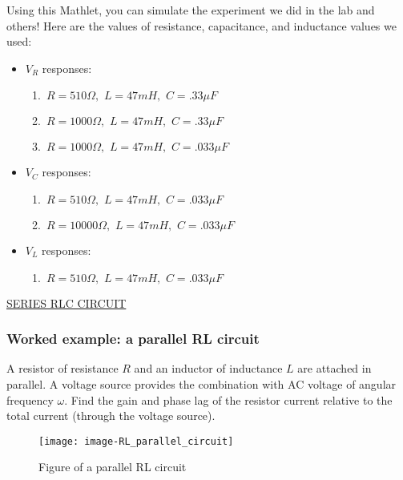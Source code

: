 Using this Mathlet, you can simulate the experiment we did in the lab and others! Here are the values of resistance, capacitance, and inductance values we used:
\begin{itemize}
\item $V _R$ responses:
  \begin{enumerate}
  \item $\,  R = 510\Omega ,\, \, L=47 mH,\, \, C= .33\mu F\,$
  \item $\,  R = 1000\Omega ,\, \, L=47 mH,\, \, C= .33\mu F\,$
  \item $\,  R = 1000\Omega ,\, \, L=47 mH,\, \, C= .033\mu F\,$
  \end{enumerate}
\item $V _C$ responses:
  \begin{enumerate}
  \item $\,  R = 510\Omega ,\, \, L=47 mH,\, \, C= .033\mu F\,$
  \item $\,  R = 10000\Omega ,\, \, L=47 mH,\, \, C= .033\mu F\,$   
  \end{enumerate}
\item $V _L$ responses:
  \begin{enumerate}
  \item $\,  R = 510\Omega ,\, \, L=47 mH,\, \, C= .033\mu F\,$
  \end{enumerate}
\end{itemize}

\href{http://mathlets.org/mathlets/series-rlc-circuit/}
{SERIES RLC CIRCUIT}
\clearpage

\subsubsection{ Worked example: a parallel RL circuit}

\begin{example}
  A resistor of resistance $R$ and an inductor of inductance $L$ are attached in parallel.
  A voltage source provides the combination with AC voltage of angular frequency $\omega$.
  Find the gain and phase lag of the resistor current relative to the total current
  (through the voltage source).
\end{example}

\Solution

\begin{figure}[ht!]
  \centering
  \texttt{[image: image-RL\_parallel\_circuit]}
  \caption{Figure of a parallel RL circuit}
\end{figure}

